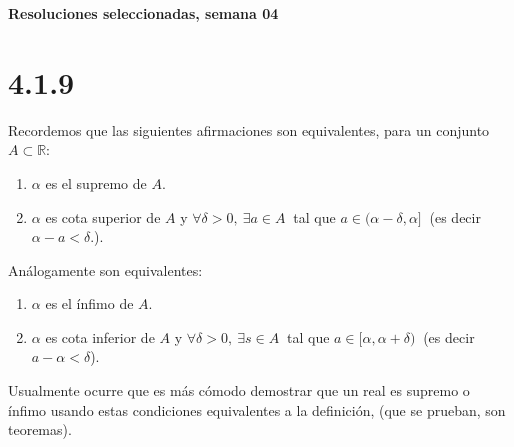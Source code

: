 \documentclass[10pt,a4paper]{article}
\begin{document}
\vspace{0,3cm}

\begin{center}
{\bf \Large Resoluciones seleccionadas, semana 04}
\end{center}


\vspace{0,3cm}

\section*{4.1.9}\emph{}%

\noindent
Recordemos que las siguientes afirmaciones son equivalentes,
para un conjunto $A \subset \mathbb{R}$:

\begin{enumerate}[label=S-\Roman*)]
\item $\alpha$ es el supremo de $A$.
\item $\alpha$ es cota superior de $A$ y
  $\forall \delta > 0, \: \exists a \in A \:$ tal que
  $ a \in (\alpha -\delta, \alpha] \: $ (es decir
  $ \alpha - a < \delta $.).
\end{enumerate}

\noindent
An\'alogamente son equivalentes:

\begin{enumerate}[label=I-\Roman*)]
\item $\alpha$ es el \'infimo de $A$.
\item $\alpha$ es cota inferior de $A$ y
  $\forall \delta > 0, \: \exists s \in A \:$ tal que
  $ a \in [\alpha, \alpha + \delta)\: $ (es decir $a - \alpha < \delta$).
\end{enumerate}

\noindent
Usualmente ocurre que es m\'as c\'omodo demostrar que un real es supremo o
\'infimo usando estas condiciones equivalentes a la definici\'on,
(que se prueban, son teoremas).
\end{document}

